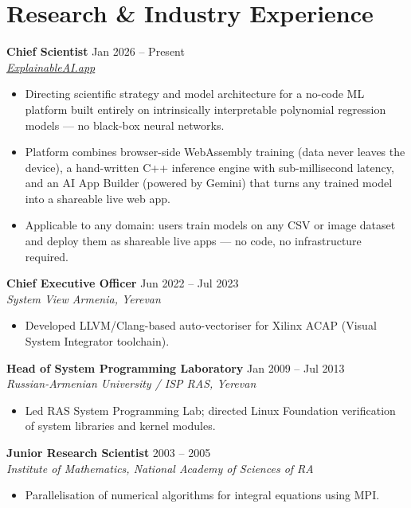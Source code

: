 \documentclass[a4paper,12pt]{article}
\newcommand{\role}[3]{%
  \par\vspace{7pt}\noindent\textbf{#1} \hfill \small\textnormal{#2} \\
  \textit{\small #3}\par\vspace{3pt}%
}
\newcommand{\pubgroup}[1]{%
  \vspace{10pt}%
  \noindent{\normalsize\bfseries\color{primary}#1}\par\vspace{-4pt}%
  \noindent{\color{primary}\rule{\linewidth}{0.5pt}}\par\vspace{3pt}%
}
\begin{document}
\section*{Research \& Industry Experience}

\pubgroup{Research}

\role{Chief Scientist}{Jan 2026 -- Present}{\href{https://www.explainableai.app}{ExplainableAI.app}}
\begin{itemize}[leftmargin=*, noitemsep, topsep=0pt]
  \item Directing scientific strategy and model architecture for a no-code ML platform built entirely on intrinsically interpretable polynomial regression models --- no black-box neural networks.
  \item Platform combines browser-side WebAssembly training (data never leaves the device), a hand-written C++ inference engine with sub-millisecond latency, and an AI App Builder (powered by Gemini) that turns any trained model into a shareable live web app.
  \item Applicable to any domain: users train models on any CSV or image dataset and deploy them as shareable live apps --- no code, no infrastructure required.
\end{itemize}

\role{Chief Executive Officer}{Jun 2022 -- Jul 2023}{System View Armenia, Yerevan}
\begin{itemize}[leftmargin=*, noitemsep, topsep=0pt]
  \item Developed LLVM/Clang-based auto-vectoriser for Xilinx ACAP (Visual System Integrator toolchain).
\end{itemize}

\role{Head of System Programming Laboratory}{Jan 2009 -- Jul 2013}{Russian-Armenian University / ISP RAS, Yerevan}
\begin{itemize}[leftmargin=*, noitemsep, topsep=0pt]
  \item Led RAS System Programming Lab; directed Linux Foundation verification of system libraries and kernel modules.
\end{itemize}

\role{Junior Research Scientist}{2003 -- 2005}{Institute of Mathematics, National Academy of Sciences of RA}
\begin{itemize}[leftmargin=*, noitemsep, topsep=0pt]
  \item Parallelisation of numerical algorithms for integral equations using MPI.
\end{itemize}
\end{document}
